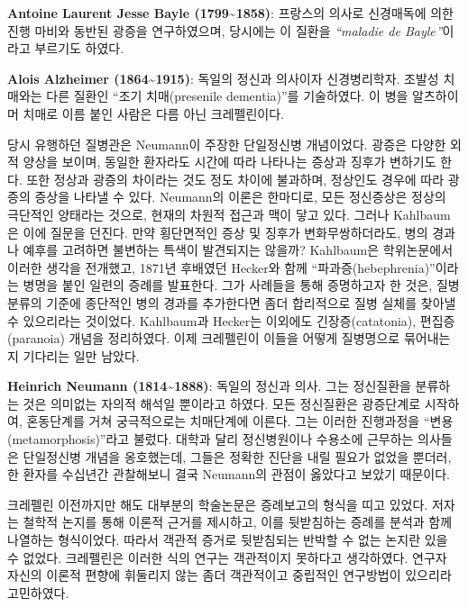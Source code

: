 \documentclass[
]{article}
\begin{document}
\textbf{Antoine Laurent Jesse Bayle (1799\textasciitilde1858)}: 프랑스의
의사로 신경매독에 의한 진행 마비와 동반된 광증을 연구하였으며, 당시에는
이 질환을 \emph{``maladie de Bayle ''}이라고 부르기도 하였다.

\textbf{Alois Alzheimer (1864\textasciitilde1915)}: 독일의 정신과
의사이자 신경병리학자. 조발성 치매와는 다른 질환인 ``조기 치매(presenile
dementia)''를 기술하였다. 이 병을 알츠하이머 치매로 이름 붙인 사람은
다름 아닌 크레펠린이다.

당시 유행하던 질병관은 Neumann이 주장한 단일정신병 개념이었다. 광증은
다양한 외적 양상을 보이며, 동일한 환자라도 시간에 따라 나타나는 증상과
징후가 변하기도 한다. 또한 정상과 광증의 차이라는 것도 정도 차이에
불과하며, 정상인도 경우에 따라 광증의 증상을 나타낼 수 있다. Neumann의
이론은 한마디로, 모든 정신증상은 정상의 극단적인 양태라는 것으로, 현재의
차원적 접근과 맥이 닿고 있다. 그러나 Kahlbaum은 이에 질문을 던진다. 만약
횡단면적인 증상 및 징후가 변화무쌍하더라도, 병의 경과나 예후를 고려하면
불변하는 특색이 발견되지는 않을까? Kahlbaum은 학위논문에서 이러한 생각을
전개했고, 1871년 후배였던 Hecker와 함께 ``파과증(hebephrenia)''이라는
병명을 붙인 일련의 증례를 발표한다. 그가 사례들을 통해 증명하고자 한
것은, 질병 분류의 기준에 종단적인 병의 경과를 추가한다면 좀더 합리적으로
질병 실체를 찾아낼 수 있으리라는 것이었다. Kahlbaum과 Hecker는 이외에도
긴장증(catatonia), 편집증(paranoia) 개념을 정리하였다. 이제 크레펠린이
이들을 어떻게 질병명으로 묶어내는지 기다리는 일만 남았다.

\textbf{Heinrich Neumann (1814\textasciitilde1888)}: 독일의 정신과 의사.
그는 정신질환을 분류하는 것은 의미없는 자의적 해석일 뿐이라고 하였다.
모든 정신질환은 광증단계로 시작하여, 혼동단계를 거쳐 궁극적으로는
치매단계에 이른다. 그는 이러한 진행과정을 ``변용(metamorphosis)''라고
불렀다. 대학과 달리 정신병원이나 수용소에 근무하는 의사들은 단일정신병
개념을 옹호했는데, 그들은 정확한 진단을 내릴 필요가 없었을 뿐더러, 한
환자를 수십년간 관찰해보니 결국 Neumann의 관점이 옳았다고 보았기
때문이다.

크레펠린 이전까지만 해도 대부분의 학술논문은 증례보고의 형식을 띠고
있었다. 저자는 철학적 논지를 통해 이론적 근거를 제시하고, 이를
뒷받침하는 증례를 분석과 함께 나열하는 형식이었다. 따라서 객관적 증거로
뒷받침되는 반박할 수 없는 논지란 있을 수 없었다. 크레펠린은 이러한 식의
연구는 객관적이지 못하다고 생각하였다. 연구자 자신의 이론적 편향에
휘둘리지 않는 좀더 객관적이고 중립적인 연구방법이 있으리라 고민하였다.
\end{document}
